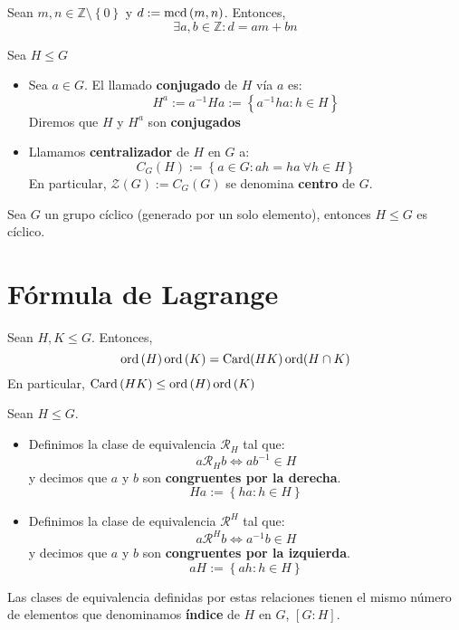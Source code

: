 \begin{prop}
Sean $m, n \in \mathbb{Z}\setminus \left\{ 0 \right\}$ y $d := \operatorname{mcd} \left( m, n \right)$. Entonces,
\[
\exists a, b \in \mathbb{Z} : d = am + bn
\]
\end{prop}

\begin{defi}
Sea $H \le G$
\begin{itemize}
\item Sea $a \in G$. El llamado \textbf{conjugado} de $H$ vía $a$ es:
\[
H^a := a^{-1}Ha := \left\{ a^{-1}ha : h \in H \right\}
\]
Diremos que $H$ y $H^a$ son \textbf{conjugados}

\item Llamamos \textbf{centralizador} de $H$ en $G$ a:
\[
C_G\left( H \right) := \left\{ a \in G: ah = ha\ \forall h \in H \right\}
\]
En particular, $\mathcal{Z}\left( G \right) := C_G\left( G \right)$ se denomina \textbf{centro} de $G$.
\end{itemize}
\end{defi}

\begin{prop}
Sea $G$ un grupo cíclico (generado por un solo elemento), entonces $H \le G$ es cíclico.
\end{prop}

\section{Fórmula de Lagrange}
\begin{prop}
Sean $H, K \le G$. Entonces,
\[
\operatorname{ord}\left( H \right)\operatorname{ord}\left( K \right) = \operatorname{Card}(HK)\operatorname{ord}(H \cap K)
\]
En particular, $\operatorname{Card}\left( HK \right) \le \operatorname{ord}\left( H \right) \operatorname{ord}\left( K \right)$
\end{prop}

\begin{defi}
Sean $H \le G$.
\begin{itemize}
    \item Definimos la clase de equivalencia $\mathcal{R}_H$ tal que:
    \[
    a \mathcal{R}_H b \Leftrightarrow a b^{-1} \in H
    \]
    y decimos que $a$ y $b$ son \textbf{congruentes por la derecha}.
    \[
    Ha := \left\{ ha : h \in H \right\}
    \]
    \item Definimos la clase de equivalencia $\mathcal{R}^H$ tal que:
    \[
    a \mathcal{R}^H b \Leftrightarrow a^{-1}b \in H
    \]
    y decimos que $a$ y $b$ son \textbf{congruentes por la izquierda}.
    \[
    a H := \left\{ ah : h \in H \right\}
    \]
\end{itemize}
Las clases de equivalencia definidas por estas relaciones tienen el mismo número de elementos que denominamos \textbf{índice} de $H$ en $G$, $\left[ G : H \right]$.
\end{defi}

